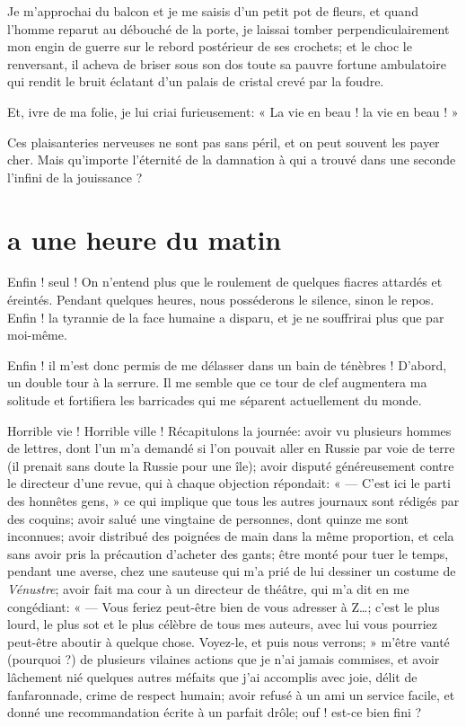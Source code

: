Je m’approchai du balcon et je me saisis
d’un petit pot de fleurs, et quand
l’homme reparut au débouché de la porte, je laissai
tomber perpendiculairement mon engin de guerre sur le rebord postérieur
de ses crochets; et le choc le renversant, il acheva de briser sous son
dos toute sa pauvre fortune ambulatoire qui rendit le bruit éclatant
d’un palais de cristal crevé par la foudre.

Et, ivre de ma folie, je lui criai furieusement: « La vie en beau ! la
vie en beau ! »

Ces plaisanteries nerveuses ne sont pas sans péril, et on peut souvent
les payer cher. Mais qu’importe
l’éternité de la damnation à qui a trouvé dans une
seconde l’infini de la jouissance ?

\quebra\section[A une heure du matin]{a une heure du matin}

Enfin ! seul ! On n’entend plus que le roulement de
quelques fiacres attardés et éreintés. Pendant quelques heures, nous
posséderons le silence, sinon le repos. Enfin ! la tyrannie de la face
humaine a disparu, et je ne souffrirai plus que par moi{}-même.

Enfin ! il m’est donc permis de me délasser dans un
bain de ténèbres ! D’abord, un double tour à la
serrure. Il me semble que ce tour de clef augmentera ma solitude et
fortifiera les barricades qui me séparent actuellement du monde.

Horrible vie ! Horrible ville ! Récapitulons la journée: avoir vu
plusieurs hommes de lettres, dont l’un
m’a demandé si l’on pouvait aller en
Russie par voie de terre (il prenait sans doute la Russie pour une
île); avoir disputé généreusement contre le directeur
d’une revue, qui à chaque objection répondait: « ---
C’est ici le parti des honnêtes gens, » ce qui
implique que tous les autres journaux sont rédigés par des coquins;
avoir salué une vingtaine de personnes, dont quinze me sont inconnues;
avoir distribué des poignées de main dans la même proportion, et cela
sans avoir pris la précaution d’acheter des gants;
être monté pour tuer le temps, pendant une averse, chez une sauteuse
qui m’a prié de lui dessiner un costume de \textit{Vénustre};
avoir fait ma cour à un directeur de théâtre, qui m’a
dit en me congédiant: « --- Vous feriez peut{}-être bien de vous adresser
à Z\ldots; c’est le plus lourd, le plus sot et le plus
célèbre de tous mes auteurs, avec lui vous pourriez peut{}-être aboutir
à quelque chose. Voyez{}-le, et puis nous verrons; »
m’être vanté (pourquoi ?) de plusieurs vilaines
actions que je n’ai jamais commises, et avoir
lâchement nié quelques autres méfaits que j’ai
accomplis avec joie, délit de fanfaronnade, crime de respect humain;
avoir refusé à un ami un service facile, et donné une recommandation
écrite à un parfait drôle; ouf ! est{}-ce bien fini ?

